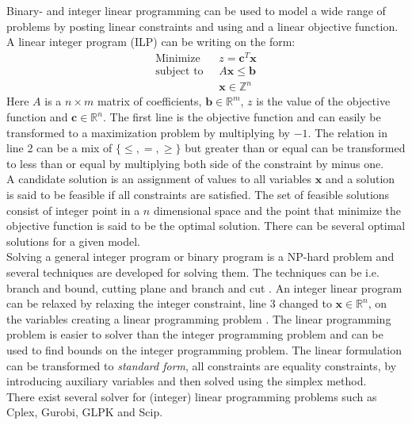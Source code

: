 Binary- and integer linear programming can be used to model a wide range of problems by posting linear constraints and 
using and a linear objective function. A linear integer program (ILP) can be writing on the form: 
\begin{align}
 \text{Minimize }\; &z =  \mathbf{c}^T\mathbf{x} \\ 
 \text{subject to } \; & A\mathbf{x} \leq \mathbf{b} \\ 
 & \mathbf{x} \in \mathbb{Z}^n
\end{align}
Here $A$ is a $n \times m$ matrix of coefficients, $\mathbf{b} \in \mathbb{R}^m$, $z$ is the value of the objective 
function and $\mathbf{c} \in \mathbb{R}^n$. The first line is the objective function and can easily be transformed to a 
maximization problem by multiplying by $-1$. The relation in line 2 can be a mix of $\{\leq,=,\geq\}$ but greater 
than or equal can be transformed to less than or equal by multiplying both side of the constraint by minus one.  \\ 
A candidate solution is an assignment of values to all variables $\mathbf{x}$ and a solution is said to be feasible if 
all constraints are satisfied. The set of feasible solutions consist of integer point in a $n$ dimensional space and 
the point that minimize the objective function is said to be the optimal solution. There can be several optimal 
solutions for a given model. \\
Solving a general integer program or binary program is a NP-hard problem \cite[p.30]{ilpbog} and several techniques are 
developed for solving them. The techniques can be i.e. branch and bound, cutting plane and branch and cut 
\cite[p.31]{ilpbog}. An integer linear program can be relaxed by relaxing the integer constraint, line 3 changed to 
$\mathbf{x} \in \mathbb{R}^n$, on the variables creating a linear programming problem \cite[p. 30]{ilpbog}. The linear 
programming problem is easier to solver than the integer programming problem and can be used to find bounds on the 
integer programming problem. The linear formulation can be transformed to \emph{standard form}, all constraints are 
equality constraints, by introducing auxiliary variables and then solved using the simplex method.  \\ 
There exist several solver for (integer) linear programming problems such as Cplex, Gurobi, GLPK and Scip. 